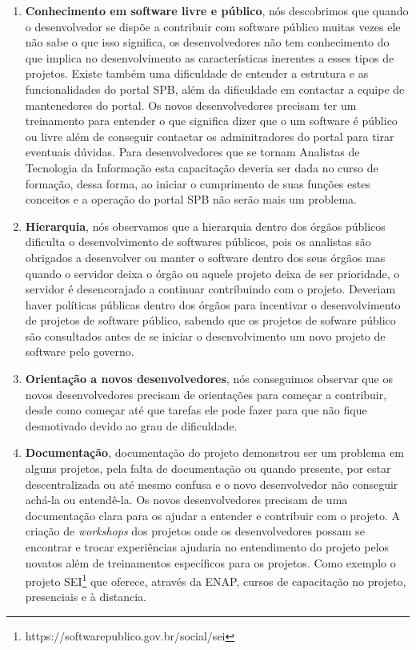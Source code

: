 \begin{enumerate}
\item \textbf{Conhecimento em software livre e público}, nós descobrimos que quando
o desenvolvedor se dispõe a contribuir com software público muitas vezes ele
não sabe o que isso significa, os desenvolvedores não
tem conhecimento do que implica no desenvolvimento as características inerentes
a esses tipos de projetos. Existe também uma dificuldade de entender a estrutura
e as funcionalidades do portal SPB, além da dificuldade em contactar a equipe de 
mantenedores do portal. Os novos desenvolvedores precisam ter um treinamento para entender
o que significa dizer que o um software é público ou livre além de conseguir contactar os
adminitradores do portal para tirar eventuais dúvidas.
Para desenvolvedores que se tornam Analistas de Tecnologia da Informação esta 
capacitação deveria ser dada no curso de formação, dessa forma, ao iniciar o cumprimento
de suas funções estes conceitos e a operação do portal SPB não serão mais um problema.

\item \textbf{Hierarquia}, nós observamos que a hierarquia dentro dos órgãos públicos 
dificulta o desenvolvimento de softwares públicos, pois os analistas são obrigados a desenvolver
ou manter o software dentro dos seus órgãos mas quando o servidor deixa o órgão ou aquele 
projeto deixa de ser prioridade, o servidor é desencorajado a continuar contribuindo com o projeto.
Deveriam haver políticas públicas dentro dos órgãos para incentivar o desenvolvimento de 
projetos de software público, sabendo que os projetos de sofware público são consultados antes de se
iniciar o desenvolvimento um novo projeto de software pelo governo. 
\\

\item \textbf{Orientação a novos desenvolvedores}, nós conseguimos observar que os 
novos desenvolvedores precisam de orientações para começar a contribuir, desde como
começar até que tarefas ele pode fazer para que não fique desmotivado devido ao grau
de dificuldade.

\item \textbf{Documentação}, documentação do projeto demonstrou ser um
problema em alguns projetos, pela falta de documentação ou quando presente, por estar descentralizada 
ou até mesmo confusa e o novo desenvolvedor não conseguir achá-la ou entendê-la. Os novos 
desenvolvedores precisam de uma documentação clara para os ajudar a entender e contribuir
com o projeto. A criação de \textit{workshops} dos projetos onde os desenvolvedores
possam se encontrar e trocar experiências ajudaria no entendimento do projeto pelos
novatos além de treinamentos específicos para os projetos. Como exemplo o projeto
SEI\footnote{https://softwarepublico.gov.br/social/sei} que oferece, através da
ENAP, cursos de capacitação no projeto, presenciais e à distancia.


\end{enumerate}

